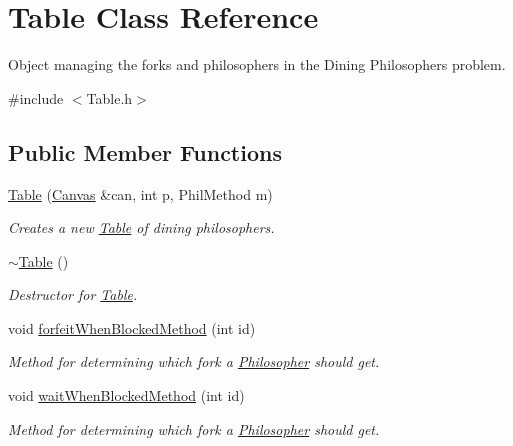 \hypertarget{class_table}{}\section{Table Class Reference}
\label{class_table}


Object managing the forks and philosophers in the Dining Philosophers\textquotesingle{} problem.  




{\ttfamily \#include $<$Table.\+h$>$}

\subsection*{Public Member Functions}
\begin{DoxyCompactItemize}
\item 
\hyperlink{class_table_a8eded0bf660ad9c12d372a2141c509f9}{Table} (\hyperlink{classtsgl_1_1_canvas}{Canvas} \&can, int p, Phil\+Method m)
\begin{DoxyCompactList}\small\item\em Creates a new \hyperlink{class_table}{Table} of dining philosophers. \end{DoxyCompactList}\item 
\mbox{\label{class_table_a9a559f2e7beb37b511ee9f88873164f8}} 
\hyperlink{class_table_a9a559f2e7beb37b511ee9f88873164f8}{$\sim$\+Table} ()
\begin{DoxyCompactList}\small\item\em Destructor for \hyperlink{class_table}{Table}. \end{DoxyCompactList}\item 
void \hyperlink{class_table_a28753e26544399b161fab6ece570a61d}{forfeit\+When\+Blocked\+Method} (int id)
\begin{DoxyCompactList}\small\item\em Method for determining which fork a \hyperlink{class_philosopher}{Philosopher} should get. \end{DoxyCompactList}\item 
void \hyperlink{class_table_ae8a58be3124849dbd9e687bf59541fcf}{wait\+When\+Blocked\+Method} (int id)
\begin{DoxyCompactList}\small\item\em Method for determining which fork a \hyperlink{class_philosopher}{Philosopher} should get. \end{DoxyCompactList}\item 

\end{DoxyCompactItemize}
